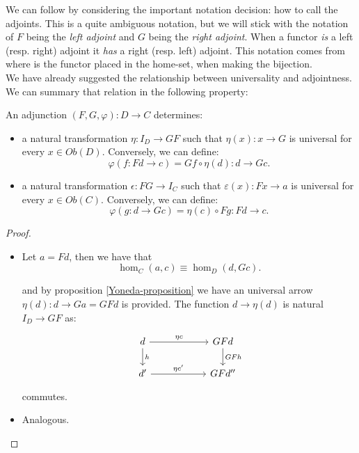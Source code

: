 We can follow by considering the important notation decision: how to call the adjoints. This is a quite ambiguous notation, but we will stick with the notation of $F$ being the \emph{left adjoint} and $G$ being the \emph{right adjoint}. When a functor \emph{is} a left (resp. right) adjoint it \emph{has} a right (resp. left) adjoint. This notation comes from where is the functor placed in the home-set, when making the bijection.\\

We have already suggested the relationship between universality and adjointness. We can summary that relation in the following property:
\begin{proposition}
  An adjunction $(F,G,\varphi): D\to C $ determines:
  \begin{itemize}
  \item a natural transformation $\eta: I_D \to GF$ such that $\eta(x):x\to G$ is universal for every $x\in Ob(D)$. Conversely, we can define:
    $$\varphi(f:Fd\to c) = Gf\circ \eta(d): d\to G c.$$
  \item a natural transformation $\epsilon: FG\to I_C$ such that $\varepsilon(x):Fx\to a$ is universal for every $x\in Ob(C)$. Conversely, we can define:
    $$\varphi(g:d\to Gc) = \eta(c)\circ Fg: Fd\to c.$$
  \end{itemize}
\end{proposition}
\begin{proof}
  \begin{itemize}
  \item Let $a=Fd$, then we have that
    $$\hom_C(a, c)\equiv\hom_D(d, Gc).$$

    and by proposition \ref{Yoneda-proposition} we have an universal arrow $\eta (d):d\to Ga=GFd$ is provided. The function $d\to \eta(d)$ is natural $I_D\to GF$ as:
    \[
  \begin{tikzpicture}
  \node {\begin{tikzcd}[column sep=20mm]
      d\ar[r,"\eta c"]\ar[d,"h"] & GFd\ar[d,"GFh"]\\
      d'\ar[r,"\eta c'"] & GFd''
  \end{tikzcd}};
\end{tikzpicture}
\]
commutes. 
  \item Analogous.
  \end{itemize} 
\end{proof}


